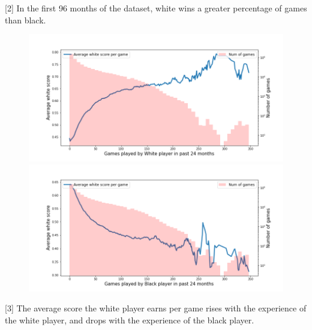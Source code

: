 \documentclass[12pt, letterpaper]{article}
\begin{document}
[2] In the first 96 months of the dataset, white wins a greater percentage of games than black.

\pagebreak

\begin{figure}[hbp]

	\centering
		
	\includegraphics[width=\linewidth]{../figures/LiChessFigs/white_pre.png}
	
	\includegraphics[width=\linewidth]{../figures/LiChessFigs/black_pre.png}
	
\end{figure}

[3] The average score the white player earns per game rises with the experience of the white player, and drops with the experience of the black player.
\end{document}
